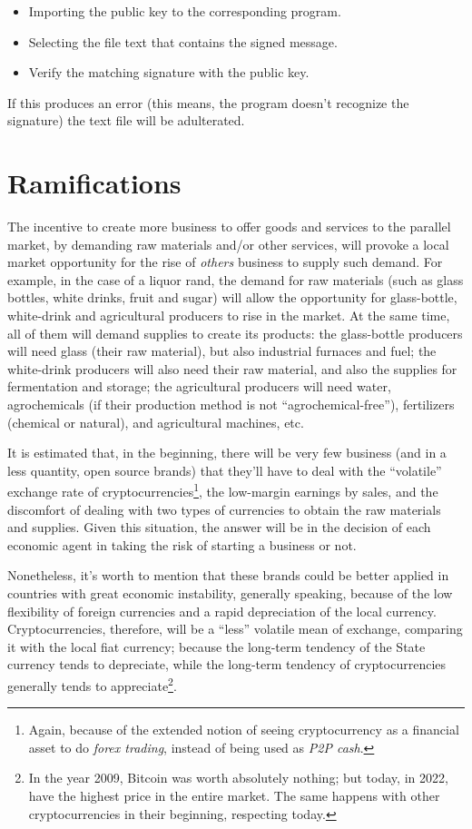 \documentclass[12pt,a4paper]{article}
\begin{document}
\begin{itemize}
\item Importing the public key to the corresponding program.
\item Selecting the file text that contains the signed message.
\item Verify the matching signature with the public key.
\end{itemize}

If this produces an error (this means, the program doesn't recognize the signature) the text file will be adulterated.

\section{Ramifications}
The incentive to create more business to offer goods and services to the parallel market, by demanding raw materials and/or other services, will provoke a local market opportunity for the rise of \textit{others} business to supply such demand. For example, in the case of a liquor rand, the demand for raw materials (such as glass bottles, white drinks, fruit and sugar) will allow the opportunity for glass-bottle, white-drink and agricultural producers to rise in the market. At the same time, all of them will demand supplies to create its products: the glass-bottle producers will need glass (their raw material), but also industrial furnaces and fuel; the white-drink producers will also need their raw material, and also the supplies for fermentation and storage; the agricultural producers will need water, agrochemicals (if their production method is not “agrochemical-free”), fertilizers (chemical or natural), and agricultural machines, etc.

It is estimated that, in the beginning, there will be very few business (and in a less quantity, open source brands) that they'll have to deal with the “volatile” exchange rate of cryptocurrencies\footnote{Again, because of the extended notion of seeing cryptocurrency as a financial asset to do \textit{forex trading}, instead of being used as \textit{P2P cash}.}, the low-margin earnings by sales, and the discomfort of dealing with two types of currencies to obtain the raw materials and supplies. Given this situation, the answer will be in the decision of each economic agent in taking the risk of starting a business or not.

Nonetheless, it's worth to mention that these brands could be better applied in countries with great economic instability, generally speaking, because of the low flexibility of foreign currencies and a rapid depreciation of the local currency. Cryptocurrencies, therefore, will be a “less” volatile mean of exchange, comparing it with the local fiat currency; because the long-term tendency of the State currency tends to depreciate, while the long-term tendency of cryptocurrencies generally tends to appreciate\footnote{In the year 2009, Bitcoin was worth absolutely nothing; but today, in 2022, have the highest price in the entire market. The same happens with other cryptocurrencies in their beginning, respecting today.}.
\end{document}
